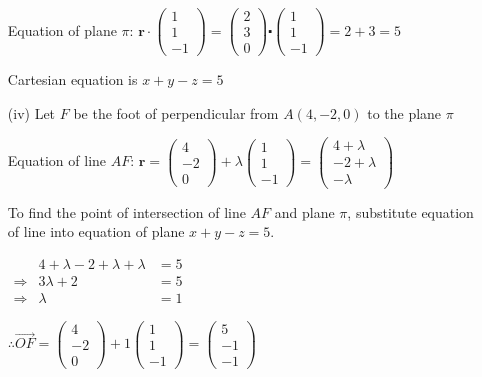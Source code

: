 \begin{enumerate}
Equation of plane $\pi\text{: }\mathbf{r}\cdot\left(\begin{matrix}1\\
1\\
-1
\end{matrix}\right)=\left(\begin{matrix}2\\
3\\
0
\end{matrix}\right)\centerdot\left(\begin{matrix}1\\
1\\
-1
\end{matrix}\right)=2+3=5$

Cartesian equation is $x+y-z=5$
\item[(iv)]  Let $F$ be the foot of perpendicular from $A(4,-2,0)$ to the plane
$\pi$

Equation of line $AF$: $\mathbf{r}=\left(\begin{matrix}4\\
-2\\
0
\end{matrix}\right)+\lambda\left(\begin{matrix}1\\
1\\
-1
\end{matrix}\right)=\left(\begin{matrix}4+\lambda\\
-2+\lambda\\
-\lambda
\end{matrix}\right)$ 

To find the point of intersection of line $AF$ and plane $\pi$,
substitute equation of line into equation of plane $x+y-z=5$. 

$\begin{array}{ccc}
 & 4+\lambda-2+\lambda+\lambda & =5\\
\Rightarrow & 3\lambda+2 & =5\\
\Rightarrow & \lambda & =1
\end{array}$

$\therefore\overrightarrow{OF}=\left(\begin{matrix}4\\
-2\\
0
\end{matrix}\right)+1\left(\begin{matrix}1\\
1\\
-1
\end{matrix}\right)=\left(\begin{matrix}5\\
-1\\
-1
\end{matrix}\right)$


\end{enumerate}
